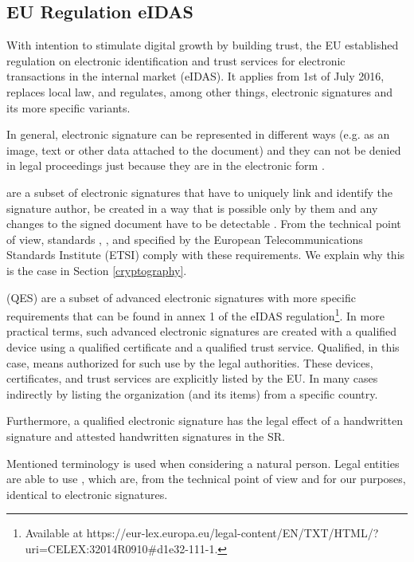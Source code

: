 \documentclass[thesismargins, english, thesislinespacing, onelinechapterstyle, upjsfrontpage]{rnthesis}
\begin{document}
\subsection{EU Regulation eIDAS} \label{eidas}

With intention to stimulate digital growth by building trust, the EU established regulation on electronic identification and trust services for electronic transactions in the internal market (eIDAS).
It applies from 1st of July 2016, replaces local law, and regulates, among other things, electronic signatures and its more specific variants.


In general, electronic signature can be represented in different ways (e.g. as an image, text or other data attached to the document) and they can not be denied in legal proceedings just because they are in the electronic form \cite{eidas}.

 are a subset of electronic signatures that have to uniquely link and identify the signature author, be created in a way that is possible only by them and any changes to the signed document have to be detectable \cite{eidas}.
From the technical point of view, standards , , and  specified by the European Telecommunications Standards Institute (ETSI) comply with these requirements. We explain why this is the case in Section \ref{cryptography}.

 (QES) are a subset of advanced electronic signatures with more specific requirements that can be found in annex 1 of the eIDAS regulation\footnote{Available at https://eur-lex.europa.eu/legal-content/EN/TXT/HTML/?uri=CELEX:32014R0910\#d1e32-111-1.}.
In more practical terms, such advanced electronic signatures are created with a qualified device using a qualified certificate and a qualified trust service.
Qualified, in this case, means authorized for such use by the legal authorities.
These devices, certificates, and trust services are explicitly listed by the EU. In many cases indirectly by listing the organization (and its items) from a specific country.

Furthermore, a qualified electronic signature has the legal effect of a handwritten signature \cite{eidas} and attested handwritten signatures in the SR.

Mentioned terminology is used when considering a natural person. Legal entities are able to use , which are, from the technical point of view and for our purposes, identical to electronic signatures.
\end{document}
